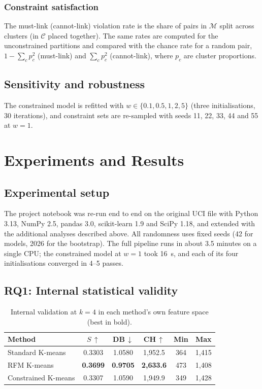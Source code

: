 \documentclass[conference,10pt]{IEEEtran}
\begin{document}
\subsubsection{Constraint satisfaction}
The must-link (cannot-link) violation rate is the share of pairs in
$\mathcal{M}$ split across clusters (in $\mathcal{C}$ placed together). The
same rates are computed for the unconstrained partitions and compared with
the chance rate for a random pair, $1-\sum_c p_c^2$ (must-link) and
$\sum_c p_c^2$ (cannot-link), where $p_c$ are cluster proportions.

\subsection{Sensitivity and robustness}
The constrained model is refitted with $w\in\{0.1, 0.5, 1, 2,
5\}$ (three initialisations, 30 iterations), and constraint sets are
re-sampled with seeds 11, 22, 33, 44 and 55 at $w=1$.


\section{Experiments and Results}
\label{sec:results}

\subsection{Experimental setup}
The project notebook was re-run end to end on the original UCI file with
Python 3.13, NumPy 2.5, pandas 3.0, scikit-learn 1.9 and SciPy 1.18, and
extended with the additional analyses described above. All randomness uses
fixed seeds (42 for models, 2026 for the bootstrap). The full pipeline runs
in about 3.5 minutes on a single CPU; the constrained model at $w=1$ took
16~s, and each of its four initialisations converged in 4--5 passes.

\subsection{RQ1: Internal statistical validity}
\label{sec:rq1}

\begin{table}[t]
\centering
\caption{Internal validation at $k=4$ in each method's own feature space
(best in bold).}
\label{tab:internal}
\footnotesize
\setlength{\tabcolsep}{3.2pt}
\begin{tabular}{lccccc}
\toprule
\textbf{Method} & \textbf{$S$\,$\uparrow$} & \textbf{DB\,$\downarrow$} &
\textbf{CH\,$\uparrow$} & \textbf{Min} & \textbf{Max}\\
\midrule
Standard K-means    & 0.3303 & 1.0580 & 1,952.5 & 364 & 1,415\\
RFM K-means         & \textbf{0.3699} & \textbf{0.9705} & \textbf{2,633.6} & 473 & 1,408\\
Constrained K-means & 0.3307 & 1.0590 & 1,949.9 & 349 & 1,428\\
\bottomrule
\end{tabular}
\end{table}
\end{document}
